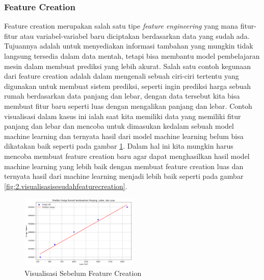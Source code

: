 \subsubsection{Feature Creation} \label{II.featurecreation}
Feature creation merupakan salah satu tipe \textit{feature engineering} yang mana fitur-fitur atau variabel-variabel baru diciptakan berdasarkan data yang sudah ada\cite{alpaydin2021machine}. Tujuannya adalah untuk menyediakan informasi tambahan yang mungkin tidak langsung tersedia dalam data mentah, tetapi bisa membantu model pembelajaran mesin dalam membuat prediksi yang lebih akurat\cite{dong2018feature}. Salah satu contoh kegunaan dari feature creation adalah dalam mengenali sebuah ciri-ciri tertentu yang digunakan untuk membuat sistem prediksi, seperti ingin prediksi harga sebuah rumah berdasarkan data panjang dan lebar, dengan data tersebut kita bisa membuat fitur baru seperti luas dengan mengalikan panjang dan lebar. Contoh visualisasi dalam kasus ini ialah saat kita memiliki data yang memiliki fitur panjang dan lebar dan mencoba untuk dimasukan kedalam sebuah model machine learning dan ternyata hasil dari model machine learning belum bisa dikatakan baik seperti pada gambar \ref{fig:2.visualisasisebelumfeaturecreation}. Dalam hal ini kita mungkin harus mencoba membuat feature creation baru agar dapat menghasilkan hasil model machine learning yang lebih baik dengan membuat feature creation luas dan ternyata hasil dari machine learning menjadi lebih baik seperti pada gambar \ref{fig:2.visualisasisesudahfeaturecreation}.

\begin{figure}[H] %
    \centering
    \includegraphics[width=0.5\textwidth]{figure/output feature creation only one feature.png}
    \caption{Visualisasi Sebelum Feature Creation}
    \label{fig:2.visualisasisebelumfeaturecreation}
\end{figure}

